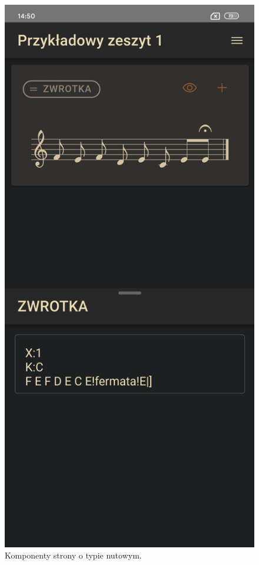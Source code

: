 \begin{figure}[H]
\begin{center}
		\includegraphics[scale=0.2]{media/ScorePage.jpg}
	\end{center}
	\caption{Komponenty strony o typie nutowym.}
	\label{rys:score-page}
\end{figure}

